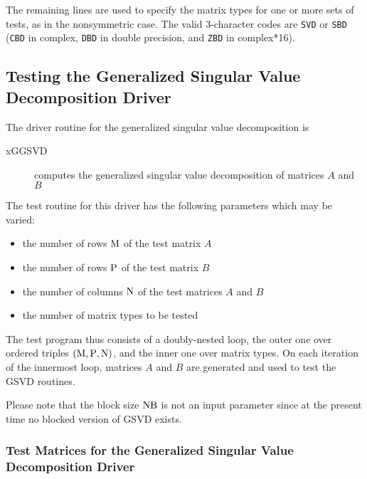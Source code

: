 \noindent
The remaining lines are used to specify the matrix types for one
or more sets of tests, as in the nonsymmetric case.
The valid 3-character codes are {\tt SVD} or {\tt SBD} ({\tt CBD}
in complex, {\tt DBD} in double precision, and {\tt ZBD} in complex*16).

\subsection{Testing the Generalized Singular Value Decomposition Driver}

\dent
The driver routine for the generalized singular value decomposition is
\begin{description}
\item[xGGSVD] computes the generalized singular value decomposition of matrices
$A$ and $B$
\end{description}

The test routine for this driver has the following parameters which may
be varied:
\begin{itemize}
\item   the number of rows ${\rm M}$ of the test matrix $A$
\item   the number of rows ${\rm P}$ of the test matrix $B$
\item   the number of columns ${\rm N}$ of the test matrices $A$ and $B$
\item   the number of matrix types to be tested
\end{itemize}
The test program thus consists of a doubly-nested
loop, the outer one over ordered triples $({\rm M},{\rm P}, {\rm N})$,
and the inner one over matrix types.
On each iteration of the innermost loop,
matrices $A$ and $B$ are generated and used
to test the GSVD routines.

Please note that the block size ${\rm NB}$ is not an input
parameter since at the present time no blocked version of GSVD exists.

\subsubsection{Test Matrices for the Generalized Singular Value Decomposition Driver}

